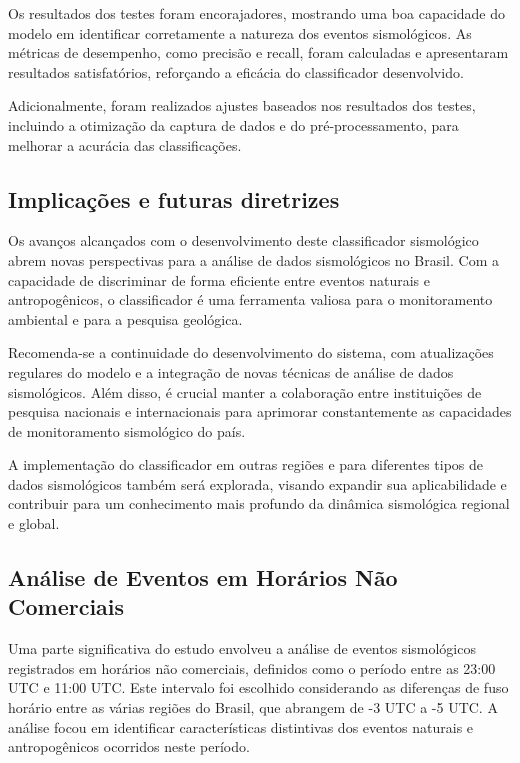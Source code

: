 \par{Os resultados dos testes foram encorajadores, mostrando uma boa capacidade do modelo em identificar corretamente a natureza dos eventos sismológicos. As métricas de desempenho, como precisão e recall, foram calculadas e apresentaram resultados satisfatórios, reforçando a eficácia do classificador desenvolvido.}

\par{Adicionalmente, foram realizados ajustes baseados nos resultados dos testes, incluindo a otimização da captura de dados e do pré-processamento, para melhorar a acurácia das classificações.}

\subsection{Implicações e futuras diretrizes}
\label{subsec:implicacoes}
\par{Os avanços alcançados com o desenvolvimento deste classificador sismológico abrem novas perspectivas para a análise de dados sismológicos no Brasil. Com a capacidade de discriminar de forma eficiente entre eventos naturais e antropogênicos, o classificador é uma ferramenta valiosa para o monitoramento ambiental e para a pesquisa geológica.}

\par{Recomenda-se a continuidade do desenvolvimento do sistema, com atualizações regulares do modelo e a integração de novas técnicas de análise de dados sismológicos. Além disso, é crucial manter a colaboração entre instituições de pesquisa nacionais e internacionais para aprimorar constantemente as capacidades de monitoramento sismológico do país.}

\par{A implementação do classificador em outras regiões e para diferentes tipos de dados sismológicos também será explorada, visando expandir sua aplicabilidade e contribuir para um conhecimento mais profundo da dinâmica sismológica regional e global.}

\subsection{Análise de Eventos em Horários Não Comerciais}
\label{subsec:nao_comerciais}



\par{Uma parte significativa do estudo envolveu a análise de eventos sismológicos registrados em horários não comerciais, definidos como o período entre as 23:00 UTC e 11:00 UTC. Este intervalo foi escolhido considerando as diferenças de fuso horário entre as várias regiões do Brasil, que abrangem de -3 UTC a -5 UTC. A análise focou em identificar características distintivas dos eventos naturais e antropogênicos ocorridos neste período.}

